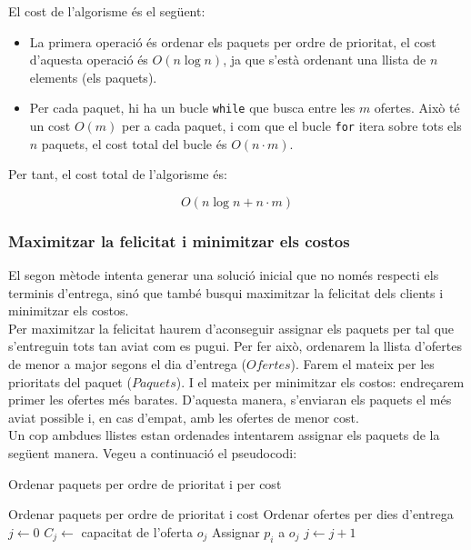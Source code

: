 \documentclass[a4paper]{article}
\begin{document}
	El cost de l'algorisme és el següent:
	
	\begin{itemize}
		\item La primera operació és ordenar els paquets per ordre de prioritat, el cost d'aquesta operació és $O(n \log n)$, ja que s'està ordenant una llista de $n$ elements (els paquets).
		\item Per cada paquet, hi ha un bucle \texttt{while} que busca entre les $m$ ofertes. Això té un cost $O(m)$ per a cada paquet, i com que el bucle \texttt{for} itera sobre tots els $n$ paquets, el cost total del bucle és $O(n \cdot m)$.
	\end{itemize}
	
	Per tant, el cost total de l'algorisme és:
	
	\[
	O(n \log n + n \cdot m)
	\]
	
	\subsubsection{Maximitzar la felicitat i minimitzar els costos}
	
	El segon mètode intenta generar una solució inicial que no només respecti els terminis d'entrega, sinó que també busqui maximitzar la felicitat dels clients i minimitzar els costos. \\
	
	Per maximitzar la felicitat haurem d'aconseguir assignar els paquets per tal que s'entreguin tots tan aviat com es pugui. Per fer això, ordenarem la llista d'ofertes de menor a major segons el dia d'entrega ($Ofertes$). Farem el mateix per les prioritats del paquet ($Paquets$). I el mateix per minimitzar els costos: endreçarem primer les ofertes més barates. D'aquesta manera, s'enviaran els paquets el més aviat possible i, en cas d'empat, amb les ofertes de menor cost. \\
	
	Un cop ambdues llistes estan ordenades intentarem assignar els paquets de la següent manera. Vegeu a continuació el pseudocodi:
	
	\begin{algorithm} [H]
		\caption{Ordenar paquets per ordre de prioritat i per cost}
		\begin{algorithmic}[1]
			\State Ordenar paquets per ordre de prioritat i cost
			\State Ordenar ofertes per dies d'entrega
			\State $j \gets 0$
			\State $C_j \gets$ capacitat de l'oferta $o_j$
			\State Assignar $p_i$ a $o_j$
			\Else
			\State $j \gets j + 1$ 
			\EndIf
			\EndWhile
			\EndFor
		\end{algorithmic}
	\end{algorithm}
	
\end{document}
